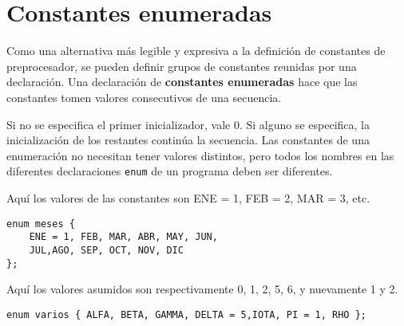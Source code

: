 \section{Constantes enumeradas}
Como una alternativa más legible y expresiva a la definición de constantes de preprocesador, se
pueden definir grupos de constantes reunidas por una declaración. Una declaración de \textbf{constantes
enumeradas} hace que las constantes tomen valores consecutivos de una secuencia. 

Si no se especifica el primer inicializador, vale 0. Si alguno se especifica, la inicialización de los
restantes continúa la secuencia. Las constantes de una enumeración no necesitan tener valores distintos, pero todos los nombres en las
diferentes declaraciones \lstinline{enum} de un programa deben ser diferentes.


\begin{ejemplo}
Aquí los valores de las constantes son ENE = 1, FEB = 2, MAR = 3, etc.
\begin{lstlisting}
enum meses { 
	ENE = 1, FEB, MAR, ABR, MAY, JUN, 
	JUL,AGO, SEP, OCT, NOV, DIC 
};
\end{lstlisting}
\end{ejemplo}
\begin{ejemplo}
Aquí los valores asumidos son respectivamente 0, 1, 2, 5, 6, y nuevamente 1 y 2.
\begin{lstlisting}
enum varios { ALFA, BETA, GAMMA, DELTA = 5,IOTA, PI = 1, RHO };	
\end{lstlisting}
\end{ejemplo}




